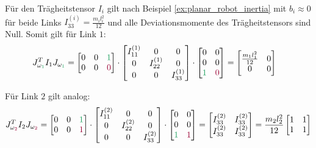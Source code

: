 \documentclass[a4paper, 12pt]{scrartcl}
\newcommand{\gruen}[2][cadGreen]{\textcolor{#1}{#2}}
\newcommand{\dunkelrot}[2][dunkelrot]{\textcolor{#1}{#2}}
\begin{document}
Für den Trägheitstensor $I_i$ gilt nach Beispiel \ref{ex:planar_robot_inertia}
mit $b_i \approx 0$ für beide Links $I^{(i)}_{33} =\frac{m_i l_i^2}{12}$ und alle 
Deviationsmomente des Trägheitstensors sind Null. Somit gilt für Link $1$:
\begin{align*}
    J_{\omega_{\gruen{1}}}^T I_1 J_{\omega_{\gruen{1}}}
    &=
    \begin{bmatrix}
        0 & 0 & \gruen{1} \\
        0 & 0 & \dunkelrot{0}
    \end{bmatrix}
    \cdot
    \begin{bmatrix}
        I^{(1)}_{11} & 0 & 0 \\
        0 & I^{(1)}_{22} & 0 \\
        0 & 0 & I^{(1)}_{33}
    \end{bmatrix}
    \cdot
    \begin{bmatrix}
        0 & 0 \\
        0 & 0 \\
        \gruen{1} & \dunkelrot{0}
    \end{bmatrix}
    =
    \begin{bmatrix}
        \frac{m_1 l_1^2}{12}    & 0 \\
        0                       & 0
    \end{bmatrix}
\end{align*}

Für Link $2$ gilt analog:
%
\begin{align*}
    J_{\omega_{\dunkelrot{2}}}^T I_2 J_{\omega_{\dunkelrot{2}}}
    =
    \begin{bmatrix}
        0 & 0 & \gruen{1} \\
        0 & 0 & \dunkelrot{1}
    \end{bmatrix}
    \cdot
    \begin{bmatrix}
        I^{(2)}_{11} & 0 & 0 \\
        0 & I^{(2)}_{22} & 0 \\
        0 & 0 & I^{(2)}_{33}
    \end{bmatrix}
    \cdot
    \begin{bmatrix}
        0 & 0 \\
        0 & 0 \\
        \gruen{1} & \dunkelrot{1}
    \end{bmatrix}
    =
    \begin{bmatrix}
        I^{(2)}_{33} & I^{(2)}_{33} \\
        I^{(2)}_{33} & I^{(2)}_{33}
    \end{bmatrix}
    =
    \frac{m_2 l_2^2}{12}
    \begin{bmatrix}
        1 & 1 \\
        1 & 1
    \end{bmatrix}
\end{align*}
\end{document}
